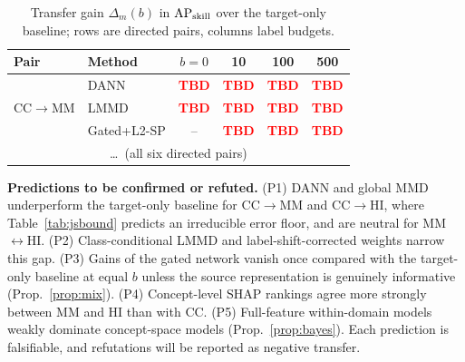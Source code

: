 \documentclass[journal]{IEEEtran}
\newcommand{\TBD}{\textcolor{red}{\textbf{TBD}}}
\newcommand{\1}{\mathbf{1}}
\begin{document}
\begin{table}[t]
\centering
\caption{Transfer gain $\Delta_m(b)$ in $\mathrm{AP}_{\rm skill}$ over the target-only baseline; rows are directed pairs, columns label budgets.}
\label{tab:transfer}
\small
\begin{tabular}{@{}llcccc@{}}
\toprule
Pair & Method & $b{=}0$ & 10 & 100 & 500 \\
\midrule
\multirow{3}{*}{CC$\to$MM} & DANN & \TBD & \TBD & \TBD & \TBD \\
 & LMMD & \TBD & \TBD & \TBD & \TBD \\
 & Gated+L2-SP & -- & \TBD & \TBD & \TBD \\
\multicolumn{6}{c}{\dots\ (all six directed pairs)} \\
\bottomrule
\end{tabular}
\end{table}

\noindent\textbf{Predictions to be confirmed or refuted.} (P1) DANN and global MMD underperform the target-only baseline for CC$\to$MM and CC$\to$HI, where Table~\ref{tab:jsbound} predicts an irreducible error floor, and are neutral for MM$\leftrightarrow$HI. (P2) Class-conditional LMMD and label-shift-corrected weights narrow this gap. (P3) Gains of the gated network vanish once compared with the target-only baseline at equal $b$ unless the source representation is genuinely informative (Prop.~\ref{prop:mix}). (P4) Concept-level SHAP rankings agree more strongly between MM and HI than with CC. (P5) Full-feature within-domain models weakly dominate concept-space models (Prop.~\ref{prop:bayes}). Each prediction is falsifiable, and refutations will be reported as negative transfer.

\end{document}
